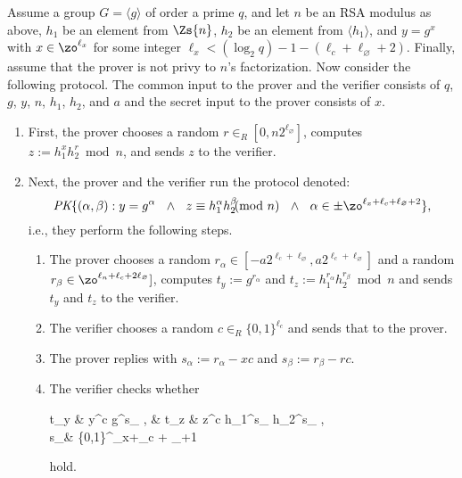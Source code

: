 Assume a group $G = \langle g \rangle$ of order a prime $q$,
and let $n$ be an RSA modulus as above,  $h_1$ be an element
from $\Zs{n}$, $h_2$ be an element from $\langle h_1 \rangle$, and
$y = g^x$ with $x \in \zo^{\ell_x}$ for some integer $\ell_x < (\log_2 q) - 1 - ( \ell_c 
+ \ell_\varnothing + 2) $. 
Finally, assume that the prover is not privy to $n$'s factorization.
Now consider the following protocol.
The common input to the prover and the verifier consists of $q$, $g$, $y$, $n$, $h_1$,  $h_2$, and $a$
and the secret input to the prover consists of $x$. 
\begin{enumerate}
\item First, the prover chooses a random $r \in_R [0,n 2^{\ell_\varnothing}]$, computes
$z := h_1^x h_2^r \bmod{n}$, and sends $z$ to the verifier.
\item Next, the prover and the verifier run the protocol denoted:
\[
\textit{PK}\{(\alpha,\beta ): y = g^\alpha 
\ \ \wedge \ \
 z \equiv h_1^\alpha h_2^\beta \!\!\!\!\pmod{n} \ \ \wedge \ \
\alpha \in  \pm\zo^{\ell_x+\ell_c + \ell_\varnothing+2}\},
\]
i.e., they perform the following 
steps.
\begin{enumerate}
\item The prover chooses a random $r_\alpha \in [-a2^{\ell_c + \ell_\varnothing}, a2^{\ell_c + \ell_\varnothing}] $
and a random $r_\beta \in \zo^{\ell_n+\ell_c + 2 \ell_\varnothing}] $, computes
$t_y := g^{r_\alpha}$ and $t_z := h_1^{r_\alpha} h_2^{r_\beta} \bmod{n}$ and 
sends $t_y$ and $t_z$ to the verifier.
\item The verifier chooses a random $c \in_R \{0,1\}^{\ell_c}$ and sends that to the 
prover.
\item The prover replies with $s_\alpha := r_\alpha - xc$ and 
$s_\beta := r_\beta - r c$.
\item The verifier checks whether 
\begin{xalignat*}{2}
t_y &   y^c g^{s_\alpha} \quad, &
t_z &  z^c h_1^{s_\alpha} h_2^{s_\beta} 
\quad, \ \text{and}\quad \\
s_\alpha &\stackrel{?}{\in}  \pm \{0,1\}^{\ell_x+\ell_c + \ell_\varnothing+1}
\end{xalignat*}
hold.
\end{enumerate}
\end{enumerate}

